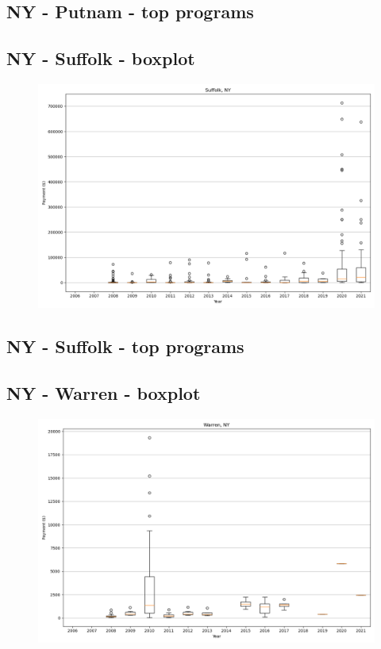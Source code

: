 \subsection*{NY - Putnam - top programs}

\newpage
\subsection*{NY - Suffolk - boxplot}
\begin{figure}[h]
\centering
\includegraphics[width=7in]{../output/boxplots/counties/Suffolk-NY_boxplot.png}
\end{figure}


\subsection*{NY - Suffolk - top programs}

\newpage
\subsection*{NY - Warren - boxplot}
\begin{figure}[h]
\centering
\includegraphics[width=7in]{../output/boxplots/counties/Warren-NY_boxplot.png}
\end{figure}


